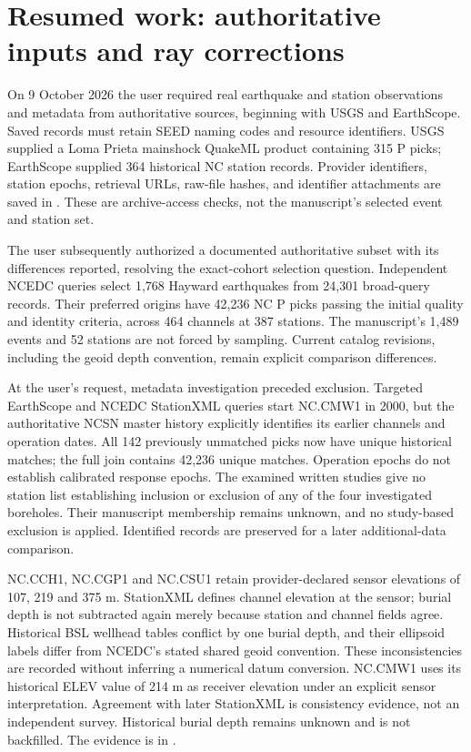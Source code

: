 \documentclass[11pt]{article}
\begin{document}
\section{Resumed work: authoritative inputs and ray corrections}
On 9 October 2026 the user required real earthquake and station observations
and metadata from authoritative sources, beginning with USGS and EarthScope.
Saved records must retain SEED naming codes and resource identifiers.
USGS supplied a Loma Prieta mainshock QuakeML product containing 315 P picks;
EarthScope supplied 364 historical NC station records. Provider identifiers,
station epochs, retrieval URLs, raw-file hashes, and identifier attachments
are saved in . These are archive-access
checks, not the manuscript's selected event and station set.

The user subsequently authorized a documented authoritative subset with its
differences reported, resolving the exact-cohort selection question. Independent
NCEDC queries select 1,768 Hayward earthquakes from 24,301 broad-query records.
Their preferred origins have 42,236 NC P picks passing the initial quality and
identity criteria, across 464 channels at 387 stations. The manuscript's 1,489
events and 52 stations are not forced by sampling. Current catalog revisions,
including the geoid depth convention, remain explicit comparison differences.

At the user's request, metadata investigation preceded exclusion. Targeted
EarthScope and NCEDC StationXML queries start NC.CMW1 in 2000, but the authoritative
NCSN master history explicitly identifies its earlier channels and operation
dates. All 142 previously unmatched picks now have unique historical matches;
the full join contains 42,236 unique matches. Operation epochs do not establish
calibrated response epochs. The examined written studies give no station list
establishing inclusion or exclusion of any of the four investigated boreholes.
Their manuscript membership remains unknown, and no study-based exclusion is
applied. Identified records are preserved for a later additional-data comparison.

NC.CCH1, NC.CGP1 and NC.CSU1 retain provider-declared sensor elevations of
107, 219 and 375 m. StationXML defines channel elevation at the sensor; burial
depth is not subtracted again merely because station and channel fields agree.
Historical BSL wellhead tables conflict by one burial depth, and their ellipsoid
labels differ from NCEDC's stated shared geoid convention. These inconsistencies
are recorded without inferring a numerical datum conversion. NC.CMW1 uses its
historical ELEV value of 214 m as receiver elevation under an explicit sensor
interpretation. Agreement with later StationXML is consistency evidence, not an
independent survey. Historical burial depth remains unknown and is not backfilled.
The evidence is in .
\end{document}
